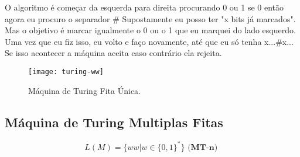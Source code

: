 \documentclass[12pt, a4paper]{article}
\begin{document}
\qquad O algoritmo é começar da esquerda para direita procurando 0 ou 1 se 0 então agora eu procuro o separador \# Supostamente eu posso ter "x bits já marcados". Mas o objetivo é marcar igualmente o 0 ou o 1 que eu marquei do lado esquerdo. Uma vez que eu fiz isso, eu volto e faço novamente, até que eu só tenha x...\#x... Se isso acontecer a máquina aceita caso contrário ela rejeita.

\begin{figure}[ht]
\centering
\texttt{[image: turing-ww]}
\caption{Máquina de Turing Fita Única.}
\end{figure}

\pagebreak
\subsection{Máquina de Turing Multiplas Fitas}

$$ L(M)= \lbrace ww \vert w \in  {\lbrace 0,1 \rbrace}^* \rbrace \textbf{ (MT-n) } $$
\end{document}
